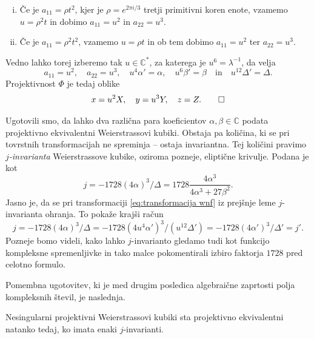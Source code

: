 \documentclass[mat1]{fmfdelo}
\numberwithin{equation}{section}
\newcommand{\C}{\mathbb C}
\newcommand{\CM}{\mathbb C ^*}
\newcommand{\inv}{^{-1}}
\theoremstyle{definition}
\begin{document}
\begin{dokaz}
\begin{enumerate}[(i)]
        \item Če je $a_{11} = \rho t^2$, kjer je $\rho = e^{2\pi i/3}$ tretji primitivni koren enote, vzamemo $u = \rho^2 t$ in dobimo $a_{11} = u^2$ in $a_{22} = u^3$.
        \item Če je $a_{11} = \rho^2 t^2$, vzamemo $u = \rho t$ in ob tem dobimo $a_{11} = u^2$ ter $a_{22} = u^3$.
    \end{enumerate}
    Vedno lahko torej izberemo tak $u \in \CM$, za katerega je $u^6 = \lambda\inv$, da velja
    \[
        a_{11} = u^2, \quad a_{22} = u^3, \quad u^4\alpha' = \alpha, \quad u^6 \beta' = \beta \quad \text{in} \quad u^{12} \Delta' = \Delta.
    \]
    Projektivnost $\Phi$ je tedaj oblike
    \[
        x = u^2 X, \quad y = u^3 Y, \quad z = Z. \qedhere
    \]
\end{dokaz}

Ugotovili smo, da lahko dva različna para koeficientov $\alpha, \beta \in \C$ podata projektivno ekvivalentni Weierstrassovi kubiki. Obstaja pa količina, ki se pri tovrstnih transformacijah ne spreminja -- ostaja invariantna. Tej količini pravimo \emph{$j$-invarianta} Weierstrassove kubike, oziroma pozneje, eliptične krivulje. Podana je kot 
\[
    j = -1728(4\alpha)^3/\Delta = 1728\frac{4\alpha^3}{4\alpha^3 + 27\beta^2}.  
\] 
Jasno je, da se pri transformaciji \eqref{eq:transformacija wnf} iz prejšnje leme $j$-invarianta ohranja. To pokaže krajši račun
\[
    j = -1728(4\alpha)^3/\Delta = -1728(4u^4\alpha')^3/(u^{12}\Delta') = -1728(4\alpha')^3/\Delta' = j'.
\]
Pozneje bomo videli, kako lahko $j$-invarianto gledamo tudi kot funkcijo kompleksne spremenljivke in tako malce pokomentirali 
izbiro faktorja $1728$ pred celotno formulo.

Pomembna ugotovitev, ki je med drugim posledica algebraične zaprtosti polja kompleksnih števil, je naslednja. 

\begin{trditev}
    \label{proj ekviv iff j enaki}
    Nesingularni projektivni Weierstrassovi kubiki sta projektivno ekvivalentni natanko tedaj, ko imata enaki $j$-invarianti.
\end{trditev}
\end{document}
